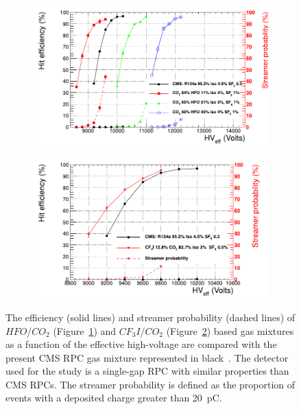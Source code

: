 \endgroup
	
	\begin{figure}[H]
		\begin{subfigure}{0.5\linewidth}
			\centering
			\includegraphics[width=\linewidth]{fig/chapt3/HFO-mixture.pdf}
			\caption{\label{fig:RPC-eco:A}}
		\end{subfigure}
		\begin{subfigure}{0.5\linewidth}
			\centering
			\includegraphics[width=\linewidth]{fig/chapt3/CF3I-mixture.pdf}
			\caption{\label{fig:RPC-eco:B}}
		\end{subfigure}
		\caption{\label{fig:RPC-eco} The efficiency (solid lines) and streamer probability (dashed lines) of $HFO$/$CO_2$ (Figure~\ref{fig:RPC-eco:A}) and $CF_3I$/$CO_2$ (Figure~\ref{fig:RPC-eco:B}) based gas mixtures as a function of the effective high-voltage are compared with the present CMS RPC gas mixture represented in black~\cite{PICCOLO2016,PHASEIITP}. The detector used for the study is a single-gap RPC with similar properties than CMS RPCs. The streamer probability is defined as the proportion of events with a deposited charge greater than \SI{20}{pC}.}
	\end{figure}

